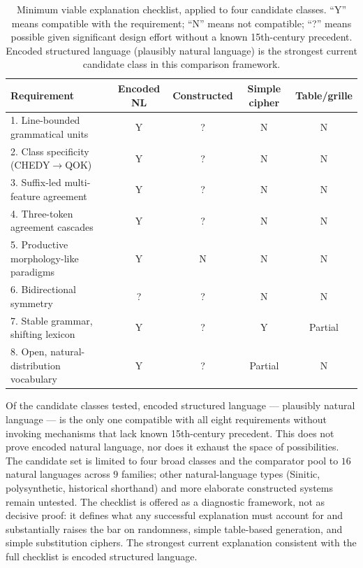 \documentclass[11pt]{article}
\begin{document}
\begin{table}[ht]
  \centering
  \caption{Minimum viable explanation checklist, applied to four candidate
  classes. ``Y'' means compatible with the requirement; ``N'' means not
  compatible; ``?'' means possible given significant design effort
  without a known 15th-century precedent. Encoded structured language
  (plausibly natural language) is the strongest current candidate class
  in this comparison framework.}
  \label{tab:mve}
  \small
  \begin{tabular}{lcccc}
    \toprule
    Requirement & Encoded NL & Constructed & Simple cipher & Table/grille \\
    \midrule
    1. Line-bounded grammatical units     & Y & ? & N & N \\
    2. Class specificity (CHEDY$\to$QOK)  & Y & ? & N & N \\
    3. Suffix-led multi-feature agreement & Y & ? & N & N \\
    4. Three-token agreement cascades     & Y & ? & N & N \\
    5. Productive morphology-like paradigms & Y & N & N & N \\
    6. Bidirectional symmetry             & ? & ? & N & N \\
    7. Stable grammar, shifting lexicon   & Y & ? & Y & Partial \\
    8. Open, natural-distribution vocabulary & Y & ? & Partial & N \\
    \bottomrule
  \end{tabular}
\end{table}

Of the candidate classes tested, encoded structured language ---
plausibly natural language --- is the only one compatible with all eight
requirements without invoking mechanisms that lack known 15th-century
precedent. This does not prove encoded natural language, nor does it
exhaust the space of possibilities. The candidate set is limited to four
broad classes and the comparator pool to $16$ natural languages across $9$ families; other natural-language types (Sinitic,
polysynthetic, historical shorthand) and more elaborate constructed
systems remain untested. The checklist is offered as a diagnostic
framework, not as decisive proof: it defines what any successful
explanation must account for and substantially raises the bar on
randomness, simple table-based generation, and simple substitution
ciphers. The strongest current explanation consistent with the full
checklist is encoded structured language.
\end{document}
